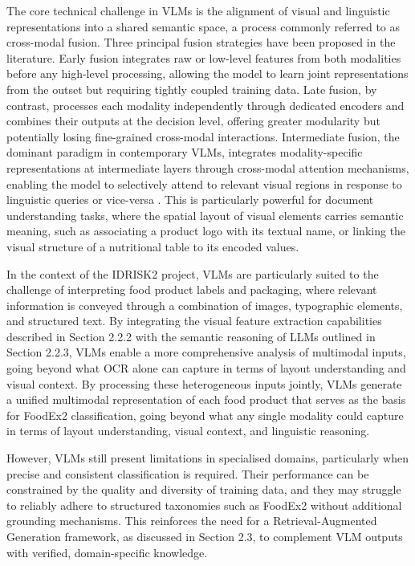 The core technical challenge in VLMs is the alignment of visual and linguistic representations into a shared semantic space, a process commonly referred to as cross-modal fusion. Three principal fusion strategies have been proposed in the literature. Early fusion integrates raw or low-level features from both modalities before any high-level processing, allowing the model to learn joint representations from the outset but requiring tightly coupled training data. Late fusion, by contrast, processes each modality independently through dedicated encoders and combines their outputs at the decision level, offering greater modularity but potentially losing fine-grained cross-modal interactions. Intermediate fusion, the dominant paradigm in contemporary VLMs, integrates modality-specific representations at intermediate layers through cross-modal attention mechanisms, enabling the model to selectively attend to relevant visual regions in response to linguistic queries or vice-versa \parencite{ye_jiang_6fce7e4a}. This is particularly powerful for document understanding tasks, where the spatial layout of visual elements carries semantic meaning, such as associating a product logo with its textual name, or linking the visual structure of a nutritional table to its encoded values.

In the context of the IDRISK2 project, VLMs are particularly suited to the challenge of interpreting food product labels and packaging, where relevant information is conveyed through a combination of images, typographic elements, and structured text. By integrating the visual feature extraction capabilities described in Section 2.2.2 with the semantic reasoning of LLMs outlined in Section 2.2.3, VLMs enable a more comprehensive analysis of multimodal inputs, going beyond what OCR alone can capture in terms of layout understanding and visual context. By processing these heterogeneous inputs jointly, VLMs generate a unified multimodal representation of each food product that serves as the basis for FoodEx2 classification, going beyond what any single modality could capture in terms of layout understanding, visual context, and linguistic reasoning.

However, VLMs still present limitations in specialised domains, particularly when precise and consistent classification is required. Their performance can be constrained by the quality and diversity of training data, and they may struggle to reliably adhere to structured taxonomies such as FoodEx2 without additional grounding mechanisms. This reinforces the need for a Retrieval-Augmented Generation framework, as discussed in Section 2.3, to complement VLM outputs with verified, domain-specific knowledge.

